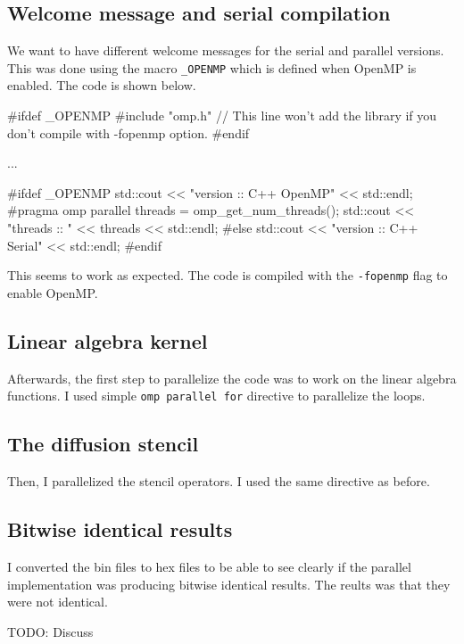\documentclass[unicode,11pt,a4paper,oneside,numbers=endperiod,openany]{scrartcl}
\begin{document}
\subsection*{Welcome message and serial compilation}
We want to have different welcome messages for the serial and parallel versions.
This was done using the macro \texttt{\_OPENMP} which is defined when OpenMP is
enabled. The code is shown below.
\begin{cppverbatim}
#ifdef _OPENMP
#include "omp.h" // This line won't add the library if you don't compile with -fopenmp option.
#endif

...

#ifdef _OPENMP
    std::cout << "version   :: C++ OpenMP" << std::endl;
#pragma omp parallel
    {
        threads = omp_get_num_threads();
    }
    std::cout << "threads   :: " << threads << std::endl;
#else
    std::cout << "version   :: C++ Serial" << std::endl;
#endif
\end{cppverbatim}    
This seems to work as expected. The code is compiled with the \texttt{-fopenmp}
flag to enable OpenMP.

\subsection*{Linear algebra kernel}
Afterwards, the first step to parallelize the code was to work on the linear algebra functions. I used simple \texttt{omp
parallel for} directive to parallelize the loops.

\subsection*{The diffusion stencil}
Then, I parallelized the
stencil operators. I used the same directive as before. 

\subsection*{Bitwise identical results}
I converted the bin files to hex files to be able to see clearly if the parallel
implementation was producing bitwise identical results. The reults was that they
were not identical.

TODO: Discuss
\end{document}
